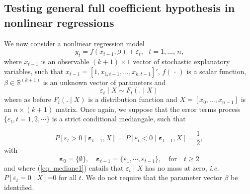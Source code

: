 \documentclass[harvard,11pt]{article}
\begin{document}
\subsection{Testing general full coefficient hypothesis in nonlinear regressions \label{nonlinear}}
We now consider a nonlinear regression model%
\begin{equation}
y_{t}=f(x_{t-1},\beta )+\varepsilon_{t},\text{ }t=1,...,\,n\text{,}
\label{eq: modelnl}
\end{equation}%
where $x_{t-1}$ is an observable $(k+1)\times 1$ vector of stochastic
explanatory variables, such that $x_{t-1}=[1,x_{1,t-1},...,x_{k,t-1}]'$, $f(\,\cdot \,)$ is a scalar function, $\beta \in 
\mathbb{R}^{(k+1)}$ is an unknown vector of parameters and
\begin{equation*}
\varepsilon_{t}\mid X \sim F_{t}(.\mid X)
\end{equation*}%
where as before $F_{t}(.\mid X)$ is a distribution function and $X=[x_0,...,x_{n-1}]$ is an $n\times (k+1)$ matrix. Once again, we suppose that the error terms process $\{\varepsilon_t,t=1,2,\cdots\}$ is a strict conditional mediangale, such that

\begin{equation}\label{eq: mediane1}
P[\varepsilon_{t}> 0\mid \bm{{\varepsilon}}_{t-1},X]=P[\varepsilon_{t}<0\mid \bm{\varepsilon}_{t-1},X]=\frac{1}{2},
\end{equation}%
with
\[
\bm{\varepsilon}_{0}=\{\emptyset\},\quad\bm{\varepsilon}_{t-1}=\{\varepsilon_1,\cdots,\varepsilon_{t-1}\},\quad\text{for}\quad t\geq2
\]
and where (\ref{eq: mediane1}) entails that $\varepsilon_t\mid X$ has no mass at zero, \emph{i.e.} $P[\varepsilon_t=0\mid X]$=0 for all $t$. We do not require that the
parameter vector $\beta $ be identified. 
\end{document}
